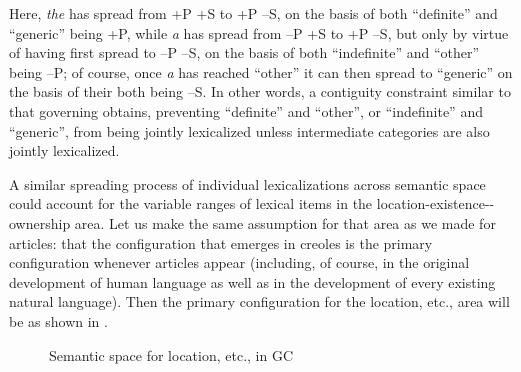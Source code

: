 \noindent Here, \textit{the} has spread from +P +S to +P --S, on the basis of both ``defi\-nite'' and ``generic'' being +P, while \textit{a} has spread from --P +S to +P --S, but only by virtue of having first spread to --P --S, on the basis of both ``indefinite'' and ``other'' being --P; of course, once \textit{a} has reached ``other'' it can then spread to ``generic'' on the basis of their both being --S. In other words, a contiguity constraint similar to that governing  obtains, preventing ``definite'' and ``other'', or ``indefinite'' and ``generic'', from being jointly lexicalized unless intermediate categories are also jointly lexicalized.

A similar spreading process of individual lexicalizations across semantic space could account for the variable ranges of lexical items
in the location-existence--ownership area. Let us make the same assumption for that area as we made for articles: that the configuration that emerges in creoles is the primary configuration whenever articles appear (including, of course, in the original development of human language as well as in the development of every existing natural language). Then the primary configuration for the location, etc., area will be as shown in . %

\begin{figure}[h]
	\begin{center}
	\end{center}
	\caption{Semantic space for location, etc., in GC}\label{fig:4.5}
\end{figure}

